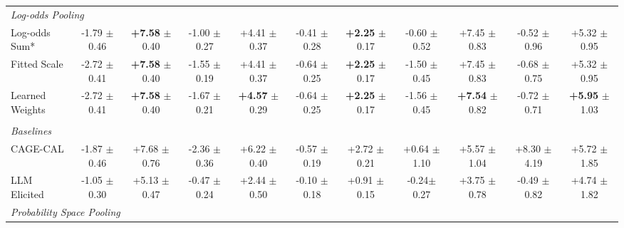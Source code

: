 \begin{table}[t]
\begin{threeparttable}
{\begin{tabular}{lcc|cc|cc|cc|cc}
\midrule
\multicolumn{11}{l}{\textit{Log-odds Pooling}}\\

Log-odds Sum* & -1.79 {\scriptsize $\pm$ 0.46} & \textbf{+7.58} {\scriptsize $\pm$ 0.40} & -1.00 {\scriptsize $\pm$ 0.27} & +4.41 {\scriptsize $\pm$ 0.37} & -0.41 {\scriptsize $\pm$ 0.28} & \textbf{+2.25} {\scriptsize $\pm$ 0.17} & -0.60 {\scriptsize $\pm$ 0.52} & +7.45 {\scriptsize $\pm$ 0.83} & -0.52 {\scriptsize $\pm$ 0.96} & +5.32 {\scriptsize $\pm$ 0.95} \\
Fitted Scale & -2.72 {\scriptsize $\pm$ 0.41} & \textbf{+7.58} {\scriptsize $\pm$ 0.40} & -1.55 {\scriptsize $\pm$ 0.19} & +4.41 {\scriptsize $\pm$ 0.37} & -0.64 {\scriptsize $\pm$ 0.25} & \textbf{+2.25} {\scriptsize $\pm$ 0.17} & -1.50 {\scriptsize $\pm$ 0.45} & +7.45 {\scriptsize $\pm$ 0.83} & -0.68 {\scriptsize $\pm$ 0.75} & +5.32 {\scriptsize $\pm$ 0.95} \\
Learned Weights & -2.72 {\scriptsize $\pm$ 0.41} & \textbf{+7.58} {\scriptsize $\pm$ 0.40} & -1.67 {\scriptsize $\pm$ 0.21} & \textbf{+4.57} {\scriptsize $\pm$ 0.29} & -0.64 {\scriptsize $\pm$ 0.25} & \textbf{+2.25} {\scriptsize $\pm$ 0.17} & -1.56 {\scriptsize $\pm$ 0.45} & \textbf{+7.54} {\scriptsize $\pm$ 0.82} & -0.72 {\scriptsize $\pm$ 0.71} & \textbf{+5.95} {\scriptsize $\pm$ 1.03} \\

\midrule
\rowcolor{headergray}
\multicolumn{11}{c}{\textit{Post Interaction: Debate Round 2}}\\
\multicolumn{11}{l}{\textit{Baselines}}\\
CAGE-CAL & -1.87 {\scriptsize $\pm$ 0.46} & +7.68 {\scriptsize $\pm$ 0.76} & -2.36 {\scriptsize $\pm$ 0.36} & +6.22 {\scriptsize $\pm$ 0.40} & -0.57 {\scriptsize $\pm$ 0.19} & +2.72 {\scriptsize $\pm$ 0.21} & +0.64 {\scriptsize $\pm$ 1.10} & +5.57 {\scriptsize $\pm$ 1.04} & +8.30 {\scriptsize $\pm$ 4.19} & +5.72 {\scriptsize $\pm$ 1.85} \\

LLM Elicited & -1.05 {\scriptsize $\pm$ 0.30} & +5.13 {\scriptsize $\pm$ 0.47} & -0.47 {\scriptsize $\pm$ 0.24} & +2.44 {\scriptsize $\pm$ 0.50} & -0.10 {\scriptsize $\pm$ 0.18} & +0.91 {\scriptsize $\pm$ 0.15} & -0.24{\scriptsize $\pm$ 0.27} & +3.75 {\scriptsize $\pm$ 0.78} & -0.49 {\scriptsize $\pm$ 0.82} & +4.74 {\scriptsize $\pm$ 1.82} \\
\midrule
\multicolumn{11}{l}{\textit{Probability Space Pooling}}\\


\end{tabular}}
\end{threeparttable}
\end{table}
